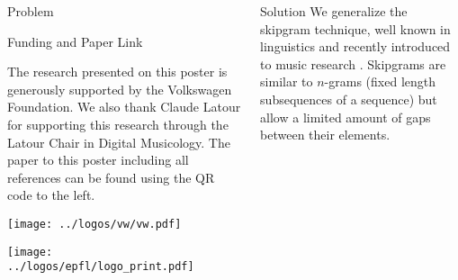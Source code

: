 \documentclass[final,cmyk]{beamer}
\newcommand{\sgcross}[1]
{
  \begin{scope}[xshift=#1cm,thick,color=epflred]
    \draw (0.35,0.1) -- (0.55,0.3);
    \draw (0.55,0.1) -- (0.35,0.3);
  \end{scope}
}
\newcommand{\sgbox}[1]
{
  \begin{scope}[xshift=#1cm]
    \draw (0,0) rectangle (0.9,0.4);
  \end{scope}
}
\newcommand{\sgboxfill}[2]
{
  \begin{scope}[xshift=#2cm]
    \draw[fill=#1] (0,0) rectangle (0.9,0.4);
  \end{scope}
}
\newcommand{\sgrow}[4][epflgray]
{
  \begin{scope}[yshift=#2cm]
    \foreach \x in {0,...,8} { \sgbox{\x} }
    \foreach \x in {#3} { \sgboxfill{#1}{\x} }
    \foreach \x in {#4} { \sgcross{\x} }
  \end{scope}
}
\begin{document}
\begin{frame}[t]
\begin{columns}[t]
\begin{column}{0.3\textwidth}
\begin{block}{Problem}
      \end{block}

      \vspace{5em}

      \begin{block}{Funding and Paper Link}
        \begin{wrapfigure}{l}{0.3\textwidth}
          \begin{center}
          \end{center}
        \end{wrapfigure}
        \small
        The research presented on this poster is generously
        supported by the Volkswagen Foundation.  We also thank
        Claude Latour for supporting this research through the
        Latour Chair in Digital Musicology.  The paper to this
        poster including all references can be found using the QR
        code to the left.
        
        
        \texttt{[image: ../logos/vw/vw.pdf]}
        
        \texttt{[image: ../logos/epfl/logo\_print.pdf]}
      \end{block}
    \end{column}
    
    \begin{column}{0.3\textwidth}
      \begin{block}{Solution}
        We generalize the \alert{skipgram technique},
        well known in linguistics \autocite{GuthrieCloserLookSkipGram2006}
        and recently introduced to music research \autocite{SearsModelingHarmonySkipGrams2017}.
        Skipgrams are similar to $n$-grams (fixed length subsequences of a sequence)
        but allow a limited amount of \alert{gaps} between their elements.

        \begin{adjustbox}{scale=2.7,center,margin=0 1ex}
        \end{adjustbox}


\end{block}
\end{column}
\end{columns}
\end{frame}
\end{document}
